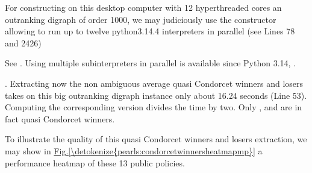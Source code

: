 \documentclass[a4paper,12pt,english]{sphinxhowto}
\begin{document}
\begin{sphinxVerbatim}[commandchars=\\\{\},numbers=left,firstnumber=1,stepnumber=1]
\end{sphinxVerbatim}
\sphinxresetverbatimhllines

\sphinxAtStartPar
For constructing on this desktop computer with 12 hyperthreaded cores an outranking digraph of order 1000, we may judiciously use the  constructor allowing to run up to twelve python3.14.4 interpreters in parallel (see Lines 7\sphinxhyphen{}8 and 24\sphinxhyphen{}26) %
\begin{footnote}[29]\sphinxAtStartFootnote
See . Using multiple subinterpreters in parallel is available since Python 3.14, .
%
\end{footnote}. Extracting now the non ambiguous average quasi Condorcet winners and losers takes on this big outranking digraph instance only about 16.24 seconds (Line 53). Computing the corresponding  version divides the time by two. Only ,  and  are in fact quasi Condorcet winners.

\sphinxAtStartPar
To illustrate the quality of this quasi Condorcet winners and losers extraction, we may show in \hyperref[\detokenize{pearls:condorcetwinnersheatmapmp}]{Fig.\@ \ref{\detokenize{pearls:condorcetwinnersheatmapmp}}} a performance heatmap of these 13 public policies.
\end{document}
